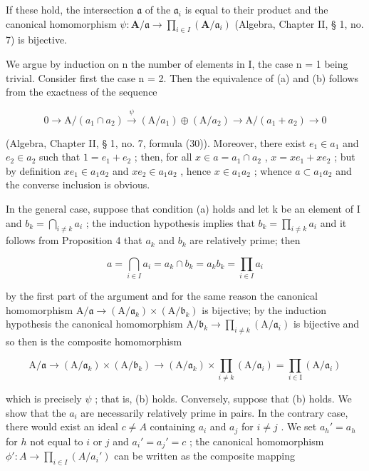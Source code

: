 If these hold, the intersection \(\mathfrak{a}\) of the \(\mathfrak{a}_i\) is equal to their product and the canonical homomorphism \(\psi: \mathbf{A} / \mathfrak{a} \to \prod_{i \in I} (\mathbf{A} / \mathfrak{a}_i)\) (Algebra, Chapter II, § 1, no. 7) is bijective.

We argue by induction on n the number of elements in I, the case n = 1 being trivial. Consider first the case n = 2. Then the equivalence of (a) and (b) follows from the exactness of the sequence

\[
0 \longrightarrow \mathrm{A} / (a _ {1} \cap a _ {2}) \stackrel {\psi} {\longrightarrow} (\mathrm{A} / a _ {1}) \oplus (\mathrm{A} / a _ {2}) \longrightarrow \mathrm{A} / (a _ {1} + a _ {2}) \longrightarrow 0
\]

(Algebra, Chapter II, § 1, no. 7, formula (30)). Moreover, there exist \(e_1 \in a_1\) and \(e_2 \in a_2\) such that \(1 = e_1 + e_2\) ; then, for all \(x \in a = a_1 \cap a_2\) , \(x = xe_1 + xe_2\) ; but by definition \(xe_1 \in a_1a_2\) and \(xe_2 \in a_1a_2\) , hence \(x \in a_1a_2\) ; whence \(a \subset a_1a_2\) and the converse inclusion is obvious.

In the general case, suppose that condition (a) holds and let k be an element of I and \(b_{k} = \bigcap_{i \neq k} a_{i}\) ; the induction hypothesis implies that \(b_{k} = \prod_{i \neq k} a_{i}\) and it follows from Proposition 4 that \(a_{k}\) and \(b_{k}\) are relatively prime; then

\[
a = \bigcap_ {i \in I} a _ {i} = a _ {k} \cap b _ {k} = a _ {k} b _ {k} = \prod_ {i \in I} a _ {i}
\]

by the first part of the argument and for the same reason the canonical homomorphism \(\mathrm{A}/\mathfrak{a}\to(\mathrm{A}/\mathfrak{a}_{k})\times(\mathrm{A}/\mathfrak{b}_{k})\) is bijective; by the induction hypothesis the canonical homomorphism \(\mathrm{A}/\mathfrak{b}_{k}\to\prod_{i\neq k}(\mathrm{A}/\mathfrak{a}_{i})\) is bijective and so then is the composite homomorphism

\[
\mathrm{A} / \mathfrak {a} \rightarrow (\mathrm{A} / \mathfrak {a} _ {k}) \times (\mathrm{A} / \mathfrak {b} _ {k}) \rightarrow (\mathrm{A} / \mathfrak {a} _ {k}) \times \prod_ {i \neq k} (\mathrm{A} / \mathfrak {a} _ {i}) = \prod_ {i \in \mathrm{I}} (\mathrm{A} / \mathfrak {a} _ {i})
\]

which is precisely \(\psi\) ; that is, (b) holds. Conversely, suppose that (b) holds. We show that the \(a_i\) are necessarily relatively prime in pairs. In the contrary case, there would exist an ideal \(c \neq A\) containing \(a_i\) and \(a_j\) for \(i \neq j\) . We set \(a_h' = a_h\) for \(h\) not equal to \(i\) or \(j\) and \(a_i' = a_j' = c\) ; the canonical homomorphism \(\phi': A \to \prod_{i \in I} (A / a_i')\) can be written as the composite mapping

